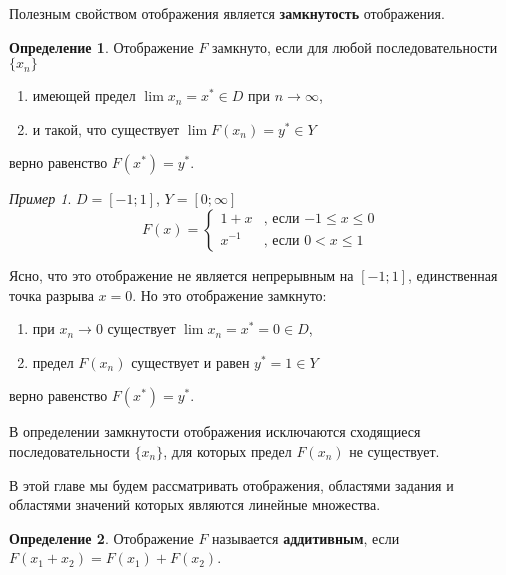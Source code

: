 \documentclass[12pt,a4paper,titlepage, oneside]{book}
\theoremstyle{definition}
\newtheorem*{definition}{Определение}
\theoremstyle{plain}
\theoremstyle{remark}
\theoremstyle{remark}
\newtheorem*{example}{Пример}
\theoremstyle{remark}
\theoremstyle{remark}
\theoremstyle{plain}
\theoremstyle{plain}
\begin{document}
Полезным свойством отображения является \textbf{замкнутость} отображения.

\begin{definition} Отображение $F$ замкнуто, если для любой последовательности  $\lbrace x_n \rbrace$

\begin{enumerate}

 \item имеющей предел $\lim x_n= x^* \in D$ при $n\to\infty$,
 
 \item и такой, что существует $\lim F(x_n)= y^* \in Y$
 
\end{enumerate} 
 
верно равенство $F(x^*)=y^*$.

\end{definition}

\begin{example}
$D=[-1;1]$, $Y=[0;\infty]$
\begin{equation*}
F(x) = 
\begin{cases}
   1+x &\text{, если $-1\leqslant x \leqslant 0$}\\
   x^{-1} &\text{, если $0< x \leqslant 1$}
\end{cases}
\end{equation*}

Ясно, что это отображение не является непрерывным на $[-1;1]$, единственная точка разрыва $x=0$. Но это отображение замкнуто:

\begin{enumerate}

 \item при $x_n \to 0$ существует $\lim x_n= x^*=0 \in D$,
 
 \item предел $F(x_n)$ существует и равен $y^*=1 \in Y$
 
\end{enumerate}
верно равенство $F(x^*)=y^*$.

\end{example}

В определении замкнутости отображения исключаются сходящиеся последовательности $\lbrace x_n \rbrace$, для которых предел $F(x_n)$ не существует.

В этой главе мы будем рассматривать отображения, областями задания и областями значений которых являются линейные множества.

\begin{definition} Отображение $F$ называется \textbf{аддитивным}, если $F(x_1+x_2)=F(x_1)+F(x_2)$.
\end{definition}
\end{document}
